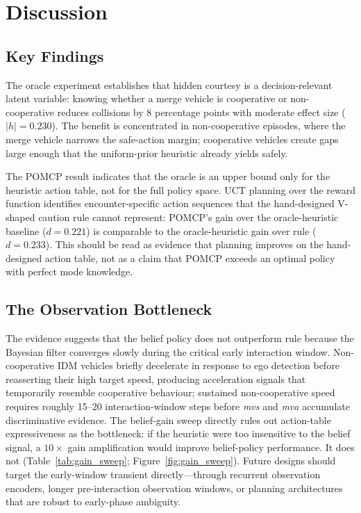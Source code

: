 \section{Discussion}
\label{sec:discussion}

\subsection{Key Findings}
The oracle experiment establishes that hidden courtesy is a
decision-relevant latent variable: knowing whether a merge vehicle is
cooperative or non-cooperative reduces collisions by 8 percentage points
with moderate effect size ($|h|{=}0.230$).
The benefit is concentrated in non-cooperative episodes, where the merge
vehicle narrows the safe-action margin; cooperative vehicles create gaps
large enough that the uniform-prior heuristic already yields safely.

The POMCP result indicates that the oracle is an upper bound only for
the heuristic action table, not for the full policy space.
UCT planning over the reward function identifies encounter-specific action
sequences that the hand-designed V-shaped caution rule cannot represent:
POMCP's gain over the oracle-heuristic baseline ($d{=}0.221$) is comparable
to the oracle-heuristic gain over rule ($d{=}0.233$).
This should be read as evidence that planning improves on the hand-designed
action table, not as a claim that POMCP exceeds an optimal policy with perfect
mode knowledge.

\subsection{The Observation Bottleneck}
The evidence suggests that the belief policy does not outperform rule because
the Bayesian filter converges slowly during the critical early interaction
window.
Non-cooperative IDM vehicles briefly decelerate in response to ego
detection before reasserting their high target speed, producing
acceleration signals that temporarily resemble cooperative behaviour;
sustained non-cooperative speed requires roughly 15--20 interaction-window
steps before \emph{mvs} and \emph{mva} accumulate discriminative evidence.
The belief-gain sweep directly rules out action-table expressiveness as
the bottleneck: if the heuristic were too insensitive to the belief signal,
a $10\times$ gain amplification would improve belief-policy performance.
It does not (Table~\ref{tab:gain_sweep}; Figure~\ref{fig:gain_sweep}).
Future designs should target the early-window transient directly---through
recurrent observation encoders, longer pre-interaction observation windows,
or planning architectures that are robust to early-phase ambiguity.

